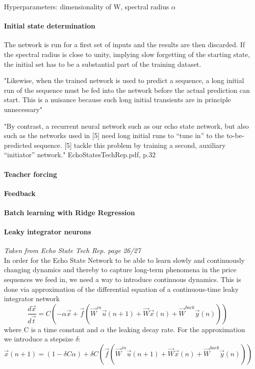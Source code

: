 Hyperparameters: dimensionality of W, spectral radius $\alpha$

\paragraph*{Initial state determination}
The network is run for a first set of inputs and the results are then discarded. If the spectral radius is close to unity, implying slow forgetting of the starting state, the initial set has to be a substantial part of the training dataset.

"Likewise, when the trained network is used to predict a sequence, a long initial run of the sequence must be fed into the network before the actual prediction can start. This is a nuisance because such long initial transients are in principle unnecessary"

"By contrast, a recurrent neural network such as our echo state network, but also such as the networks used in [5] need long initial runs to “tune in” to the to-be-predicted sequence. [5] tackle this problem by training a second, auxiliary “initiator” network."
EchoStatesTechRep.pdf, p.32

\paragraph*{Teacher forcing}

\paragraph*{Feedback}

\paragraph*{Batch learning with Ridge Regression}

\paragraph*{Leaky integrator neurons}
\emph{Taken from Echo State Tech Rep. page 26/27}\\
In order for the Echo State Network to be able to learn slowly and continuously changing dynamics and thereby to capture long-term phenomena in the price sequences we feed in, we need a way to introduce continuous dynamics. This is done via approximation of the differential equation of a continuous-time leaky integrator network
\begin{equation}
    \frac{d\vec{x}}{d\vec{t}} = C (-\alpha\vec{x} + \vec{f}(\vec{W}^{in}\vec{u}(n+1)+\vec{W}\vec{x}(n)+\vec{W}^{back}\vec{y}(n)))
\end{equation}
where C is a time constant and $\alpha$ the leaking decay rate. For the approximation we introduce a stepsize $\delta$:
\[
    \vec{x}(n+1)=(1-\delta C \alpha) + \delta C (\vec{f}(\vec{W}^{in}\vec{u}(n+1)+\vec{W}\vec{x}(n)+\vec{W}^{back}\vec{y}(n)))
\]

